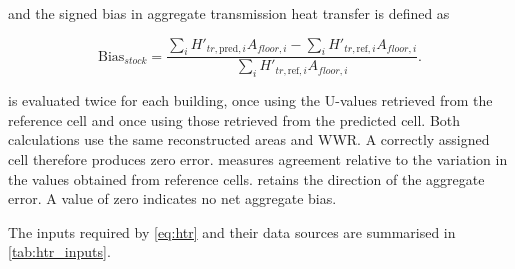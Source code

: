 and the signed bias in aggregate transmission heat transfer is defined as

\begin{equation}
	\label{eq:bias_stock}
	\mathrm{Bias}_{stock}
	= \frac{\sum_i H'_{tr,\mathrm{pred},i}A_{floor,i} - \sum_i H'_{tr,\mathrm{ref},i}A_{floor,i}}
	{\sum_i H'_{tr,\mathrm{ref},i}A_{floor,i}} .
\end{equation}

 is evaluated twice for each building, once using the U-values retrieved from the reference cell and once using those retrieved from the predicted cell.
Both calculations use the same reconstructed areas and WWR.
A correctly assigned cell therefore produces zero error.
 measures agreement relative to the variation in the values obtained from reference cells.
 retains the direction of the aggregate error.
A value of zero indicates no net aggregate bias.

The inputs required by \cref{eq:htr} and their data sources are summarised in \cref{tab:htr_inputs}.

